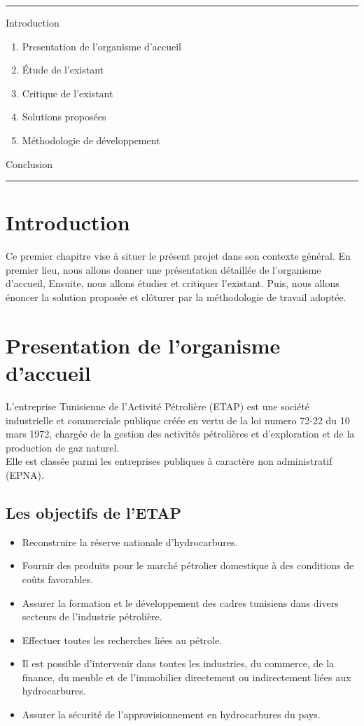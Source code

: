 \documentclass[12pt]{report}
\begin{document}
\hrule
\vspace{20pt}
Introduction
\begin{enumerate}
	\item Presentation de l'organisme d'accueil
	\item Étude de l'existant
	\item Critique de l'existant
	\item Solutions proposées
	\item Méthodologie de développement
\end{enumerate}

Conclusion
\vspace{20pt}
\hrule
\newpage
\section*{Introduction}
Ce premier chapitre vise à situer le présent projet dans son contexte général. En premier lieu, nous allons donner une présentation détaillée de l'organisme d'accueil, Ensuite, nous allons étudier et critiquer l'existant. Puis, nous allons énoncer la solution proposée et clôturer par la méthodologie de travail adoptée.

\section{Presentation de l'organisme d'accueil}


L'entreprise Tunisienne de l'Activité Pétrolière (ETAP) est une société \mbox{industrielle} et commerciale publique créée en vertu de la loi numero 72-22 du 10 mars 1972, chargée de la gestion des activités pétrolières et d'exploration et de la production de gaz naturel.\\
Elle est classée parmi les entreprises publiques à caractère non administratif (EPNA).
\subsection{Les objectifs de l'ETAP} 

\begin{itemize}[label={$\bullet$}]
    \item Reconstruire la réserve nationale d'hydrocarbures.
    \item Fournir des produits pour le marché pétrolier domestique à des conditions de coûts favorables.
    \item Assurer la formation et le développement des cadres tunisiens dans divers secteurs de l'industrie pétrolière.
    \item Effectuer toutes les recherches liées au pétrole.
    \item Il est possible d'intervenir dans toutes les industries, du commerce, de la finance, du meuble et de l'immobilier directement ou indirectement liées aux hydrocarbures.
	\item Assurer la sécurité de l'approvisionnement en hydrocarbures du pays.
\end{itemize}
\end{document}
